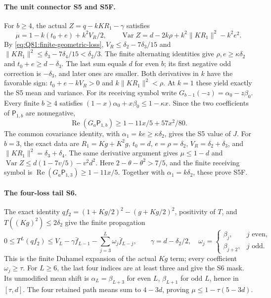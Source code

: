 \paragraph{The unit connector S5 and S5F.}
For \(b\ge4\), the actual \(Z=q-kKR_1-\gamma\) satisfies
\[
 \mu=1-k(t_0+e)+k^2V_R/2,\qquad
 \operatorname{Var}Z=d-2k\rho+k^2\|KR_1\|^2-k^2e^2.
\]
By \eqref{eq:Q81:finite-geometric-loss},
\(V_R\le\delta_2-7\delta_3/15\) and
\(\|KR_1\|^2\le\delta_3-7\delta_4/15<\delta_2/3\).
The finite alternating identities give
\(\rho,e\ge\kappa\delta_2\) and \(t_0+e\ge d-\delta_3\).
The last sum equals \(d\) for even \(b\); its first negative
odd correction is \(-\delta_3\), and later ones are smaller.
Both derivatives in \(k\) have the favorable sign:
\(t_0+e-kV_R>0\) and \(k\|KR_1\|^2<\rho\).
At \(k=1\) these yield exactly the S5 mean and variance.
For its receiving symbol write \(G_{b-1}(-z)=\alpha_0-z\beta_0\).
Every finite \(b\ge4\) satisfies
\((1-x)\alpha_0+x\beta_0\le1-\kappa x\).
Since the two coefficients of \(\mathsf P_{1,b}\) are nonnegative,
\[
 \operatorname{Re}(G_a\mathsf P_{1,b})
 \ge1-11x/5+57x^2/80.
\]
The common covariance identity, with
\(\alpha_1=ke\ge\kappa\delta_2\), gives the S5 value of \(J\).
For \(b=3\), the exact data are
\(R_1=Kg+K^2g\), \(t_0=d\), \(e=\rho=\delta_2\),
\(V_R=\delta_2+\delta_3\), and
\(\|KR_1\|^2=\delta_3+\delta_4\).
The same derivative argument gives
\(\mu\le1-d\) and
\(\operatorname{Var}Z\le d(1-7v/5)-v^2d^2\).
Here \(2-\theta-\theta^2>7/5\), and the finite receiving symbol is
\(\operatorname{Re}(G_a\mathsf P_{1,3})\ge1-11x/5\).
Together with \(\alpha_1=k\delta_2\), these prove S5F.

\paragraph{The four-loss tail S6.}
The exact identity
\(qf_2=(1+Kg/2)^2-(g+Kg/2)^2\), positivity of \(T\),
and \(T((Kg)^2)\le2\delta_2\) give the finite propagation
\[
 0\le T^L(qf_2)\le V_L-\gamma\bar f_{L-1}
       -\sum_{j=3}^L\omega_j\bar f_{L-j},\qquad
 \gamma=d-\delta_2/2,\quad
 \omega_j=\begin{cases}\beta_j,&j\text{ even},\\
                         \beta_{j+2},&j\text{ odd}.
             \end{cases}
\]
This is the finite Duhamel expansion of the actual \(Kg\) term;
every coefficient \(\omega_j\ge\tau\). For \(L\ge6\), the last
four indices are at least three and give the S6 mask. Its unmodified
mean shift is \(\alpha_L=\beta_{L+3}\) for even \(L\),
\(\beta_{L+1}\) for odd \(L\), hence in \([\tau,d]\).
The four retained path means sum to \(4-3d\), proving
\(\mu\le1-\tau(5-3d)\).


